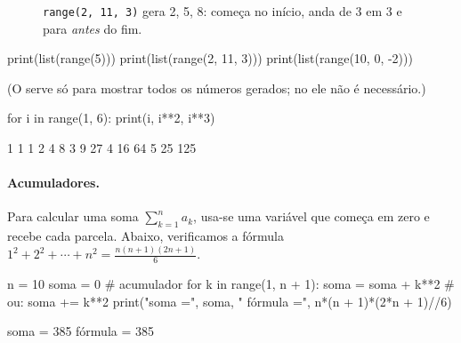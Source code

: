 {{\begin{figure}[ht]
\centering
{}
\caption{\texttt{range(2, 11, 3)} gera 2, 5, 8: começa no início, anda de 3 em 3 e para \emph{antes} do fim.}
\end{figure}

\begin{entrada}
print(list(range(5)))
print(list(range(2, 11, 3)))
print(list(range(10, 0, -2)))
\end{entrada}
\begin{saida}
[0, 1, 2, 3, 4]
[2, 5, 8]
[10, 8, 6, 4, 2]
\end{saida}

(O  serve só para mostrar todos os números gerados; no  ele não é necessário.)

\begin{entrada}
for i in range(1, 6):
    print(i, i**2, i**3)
\end{entrada}
\begin{saida}
1 1 1
2 4 8
3 9 27
4 16 64
5 25 125
\end{saida}

\paragraph{Acumuladores.} Para calcular uma soma $\sum_{k=1}^{n} a_k$, usa-se uma variável que começa em zero e
recebe cada parcela. Abaixo, verificamos a fórmula $1^2+2^2+\cdots+n^2=\frac{n(n+1)(2n+1)}{6}$.

\begin{entrada}
n = 10
soma = 0                  # acumulador
for k in range(1, n + 1):
    soma = soma + k**2    # ou: soma += k**2
print("soma =", soma, "  fórmula =", n*(n + 1)*(2*n + 1)//6)
\end{entrada}
\begin{saida}
soma = 385   fórmula = 385
\end{saida}

}}
